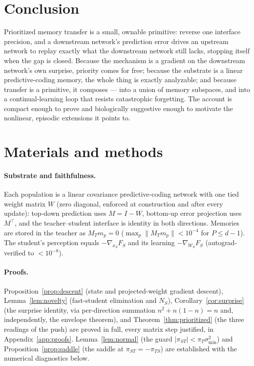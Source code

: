 \documentclass[10pt,letterpaper]{article}
\theoremstyle{plain}
\theoremstyle{remark}
\newcommand{\xS}{x_S}
\newcommand{\WS}{W_S}
\newcommand{\MT}{M_T}
\newcommand{\NS}{N_S}
\newcommand{\FS}{F_S}
\newcommand{\piT}{\pi_T}
\newcommand{\piTS}{\pi_{TS}}
\newcommand{\piST}{\pi_{ST}}
\newcommand{\tr}{^{\!\top}}
\begin{document}
\section{Conclusion}
Prioritized memory transfer is a small, ownable primitive: reverse one interface precision, and a
downstream network's prediction error drives an upstream network to replay exactly what the downstream
network still lacks, stopping itself when the gap is closed. Because the mechanism is a gradient on the
downstream network's own surprise, priority comes for free; because the substrate is a linear
predictive-coding memory, the whole thing is exactly analyzable; and because transfer is a primitive, it
composes --- into a union of memory subspaces, and into a continual-learning loop that resists
catastrophic forgetting. The account is compact enough to prove and biologically suggestive enough to
motivate the nonlinear, episodic extensions it points to.

\section*{Materials and methods}
\paragraph{Substrate and faithfulness.} Each population is a linear covariance predictive-coding network
with one tied weight matrix $W$ (zero diagonal, enforced at construction and after every update):
top-down prediction uses $M=I-W$, bottom-up error projection uses $M\tr$, and the teacher--student
interface is identity in both directions. Memories are stored in the teacher as $\MT m_p=0$
($\max_p\|\MT m_p\|<10^{-4}$ for $P\le d-1$). The student's perception equals $-\nabla_{\xS}\FS$ and its
learning $-\nabla_{\WS}\FS$ (autograd-verified to $<10^{-8}$).

\paragraph{Proofs.} Proposition~\ref{prop:descent} (state and projected-weight gradient descent),
Lemma~\ref{lem:novelty} (fast-student elimination and $\NS$), Corollary~\ref{cor:surprise} (the surprise
identity, via per-direction summation $n^2+n(1-n)=n$ and, independently, the envelope theorem), and
Theorem~\ref{thm:prioritized} (the three readings of the push) are proved in full, every matrix step
justified, in Appendix~\ref{app:proofs}. Lemma~\ref{lem:normal} (the guard $|\piST|<\piT\sigma_{\min}^2$)
and Proposition~\ref{prop:saddle} (the saddle at $\piST=-\piTS$) are established with the numerical
diagnostics below.
\end{document}
